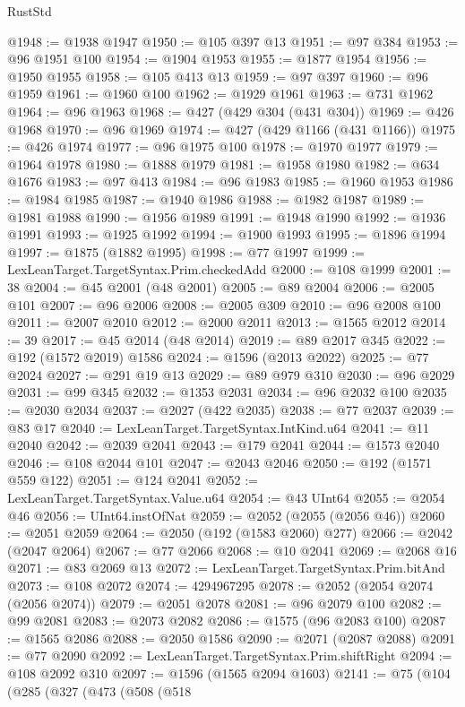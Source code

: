 \begin{lexlean}{RustStd}
\begin{coremodule}
@1948 := @1938 @1947
@1950 := @105 @397 @13
@1951 := @97 @384
@1953 := @96 @1951 @100
@1954 := @1904 @1953
@1955 := @1877 @1954
@1956 := @1950 @1955
@1958 := @105 @413 @13
@1959 := @97 @397
@1960 := @96 @1959
@1961 := @1960 @100
@1962 := @1929 @1961
@1963 := @731 @1962
@1964 := @96 @1963
@1968 := @427 (@429 @304 (@431 @304))
@1969 := @426 @1968
@1970 := @96 @1969
@1974 := @427 (@429 @1166 (@431 @1166))
@1975 := @426 @1974
@1977 := @96 @1975 @100
@1978 := @1970 @1977
@1979 := @1964 @1978
@1980 := @1888 @1979
@1981 := @1958 @1980
@1982 := @634 @1676
@1983 := @97 @413
@1984 := @96 @1983
@1985 := @1960 @1953
@1986 := @1984 @1985
@1987 := @1940 @1986
@1988 := @1982 @1987
@1989 := @1981 @1988
@1990 := @1956 @1989
@1991 := @1948 @1990
@1992 := @1936 @1991
@1993 := @1925 @1992
@1994 := @1900 @1993
@1995 := @1896 @1994
@1997 := @1875 (@1882 @1995)
@1998 := @77 @1997
@1999 := LexLeanTarget.TargetSyntax.Prim.checkedAdd
@2000 := @108 @1999
@2001 := 38
@2004 := @45 @2001 (@48 @2001)
@2005 := @89 @2004
@2006 := @2005 @101
@2007 := @96 @2006
@2008 := @2005 @309
@2010 := @96 @2008 @100
@2011 := @2007 @2010
@2012 := @2000 @2011
@2013 := @1565 @2012
@2014 := 39
@2017 := @45 @2014 (@48 @2014)
@2019 := @89 @2017 @345
@2022 := @192 (@1572 @2019) @1586
@2024 := @1596 (@2013 @2022)
@2025 := @77 @2024
@2027 := @291 @19 @13
@2029 := @89 @979 @310
@2030 := @96 @2029
@2031 := @99 @345
@2032 := @1353 @2031
@2034 := @96 @2032 @100
@2035 := @2030 @2034
@2037 := @2027 (@422 @2035)
@2038 := @77 @2037
@2039 := @83 @17
@2040 := LexLeanTarget.TargetSyntax.IntKind.u64
@2041 := @11 @2040
@2042 := @2039 @2041
@2043 := @179 @2041
@2044 := @1573 @2040
@2046 := @108 @2044 @101
@2047 := @2043 @2046
@2050 := @192 (@1571 @559 @122)
@2051 := @124 @2041
@2052 := LexLeanTarget.TargetSyntax.Value.u64
@2054 := @43 UInt64
@2055 := @2054 @46
@2056 := UInt64.instOfNat
@2059 := @2052 (@2055 (@2056 @46))
@2060 := @2051 @2059
@2064 := @2050 (@192 (@1583 @2060) @277)
@2066 := @2042 (@2047 @2064)
@2067 := @77 @2066
@2068 := @10 @2041
@2069 := @2068 @16
@2071 := @83 @2069 @13
@2072 := LexLeanTarget.TargetSyntax.Prim.bitAnd
@2073 := @108 @2072
@2074 := 4294967295
@2078 := @2052 (@2054 @2074 (@2056 @2074))
@2079 := @2051 @2078
@2081 := @96 @2079 @100
@2082 := @99 @2081
@2083 := @2073 @2082
@2086 := @1575 (@96 @2083 @100)
@2087 := @1565 @2086
@2088 := @2050 @1586
@2090 := @2071 (@2087 @2088)
@2091 := @77 @2090
@2092 := LexLeanTarget.TargetSyntax.Prim.shiftRight
@2094 := @108 @2092 @310
@2097 := @1596 (@1565 @2094 @1603)
@2141 := @75
    (@104
      (@285
        (@327
          (@473
            (@508
              (@518

\end{coremodule}
\end{lexlean}
